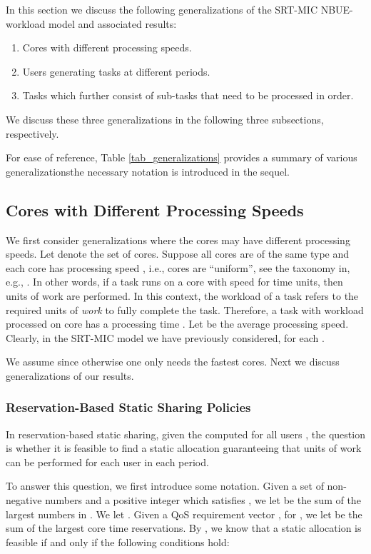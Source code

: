 \documentclass[prodmode,acmtompecs]{acmsmall}
\begin{document}
In this section we discuss the following generalizations of the SRT-MIC NBUE-workload model and associated results: 
\begin{enumerate}
\item Cores with different processing speeds. 
\item Users generating tasks at different periods. 
\item Tasks which further consist of sub-tasks that need to be processed in order. 
\end{enumerate}
We discuss these three generalizations in the following three subsections, respectively. 

For ease of reference, Table \ref{tab_generalizations} provides a summary of various generalizations\textemdash the necessary notation is introduced in the sequel.  

\subsection{Cores with Different Processing Speeds}
We first consider generalizations where the cores may have different processing speeds. 
Let  denote the set of cores. Suppose all cores are of the same type and each core  has processing speed , 
i.e., cores are ``uniform'', see the taxonomy in, e.g., \cite{DaB11}. 
In other words, if a task runs on a core with speed  for  time units, then  units of work are performed. 
In this context, the workload of a task refers to the required units of \emph{work} to fully complete the task. 
Therefore, a task with workload  processed on core  has a processing time .
Let  be the average processing speed. 
Clearly, in the SRT-MIC model we have previously considered,  for each . 

We assume  since otherwise one only needs the  fastest cores. 
Next we discuss generalizations of our results. 

\subsubsection{Reservation-Based Static Sharing Policies}

In reservation-based static sharing, given the computed  for all users , the question is whether it is feasible to find a static allocation guaranteeing that  units of work can be performed for each user  in each period. 

\newcommand{\sumFnName}{a}

To answer this question, we first introduce some notation. 
Given a set  of non-negative numbers and a positive integer  which satisfies , we let  be the sum of the largest  numbers in . 
We let . 
Given a QoS requirement vector , for , we let  be the sum of the  largest core time reservations. 
By \cite{FGB01,FuM09}, we know that a static allocation is feasible if and only if the following conditions hold: 
\end{document}
